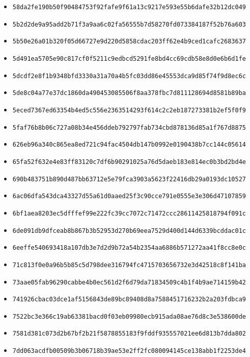 {\begin{itemize}
    \item \texttt{58da2fe190b50f90484753f92fafe9f61a13c9217e593e55b6dafe32b12dc049}
    \item \texttt{5b2d2de9a95add2b71f3a9aa6c02fa56555b7d58270fd073384187f52b76a603}
    \item \texttt{5b50e26a01b320f05d66727e9d220d5858cdac203ff62e4b9ced1cafc2683637}
    \item \texttt{5d491ea5705e90c817cf0f5211c9edbcd5291fe8bd4cc69cdb58e8d0e6b6d1fe}
    \item \texttt{5dcdf2e8f1b9348bfd3330a31a70a4b5fc03dd86e45553dca9d85f74f9d8ec6c}
    \item \texttt{5de8c04a77e37dc1860da490453085506f8aa378fbc7d811128694d8581b89ba}
    \item \texttt{5eced7367ed63354b4ed5c556e2363514293f614c2c2eb187273381b2ef5f0f9}
    \item \texttt{5faf76b8b06c727a08b34e456ddeb792797fab734cbd878136d85a1f767d8875}
    \item \texttt{626eb96a340c865ea8ed721c94fac4504db147b0992e0190438b7cc144c05614}
    \item \texttt{65fa52f632e4e83ff83120c7df6b90291025a76d5daeb183e814ec0b3bd2bd4e}
    \item \texttt{690b483751b890d487bb63712e5e79fca3903a5623f22416db29a0193dc10527}
    \item \texttt{6ac06dfa543dca43327d55a61d0aaed25f3c90cce791e0555e3e306d47107859}
    \item \texttt{6bf1aea8203ec5dfffef99e222fc39cc7072c71472ccc28611425818794f091c}
    \item \texttt{6de091db9dfceab8b867b3b52953d270b69eea7529d400d144d6339bcddac01c}
    \item \texttt{6eeffe540693418a107db3e7d2d9b72a54b2354aa6886b571272aa41f8cc8e0c}
    \item \texttt{71c813f0e0a96b5b85c5d798dee316794fc4715703656732e3d42518c8f141ba}
    \item \texttt{73aae05fab96290cabbe4b0ec561d2f6d79da71834509c4b1f4b9ae714159b42}
    \item \texttt{741926cbac03dce1af5156843de89bc89408d8a7588451716232b2a203fdbca9}
    \item \texttt{7522bc3e366c19ab63381bacd0f03eb09980ecb915ada08ae76d8c3e538600de}
    \item \texttt{7581d381c073d2b67bf2b21f5878855183f9fddf935557021ee6d813b7dda802}
    \item \texttt{7dd063acdfb00509b3b06718b39ae53e2ff2fc080094145ce138abb1f2253de4}

\end{itemize}}
